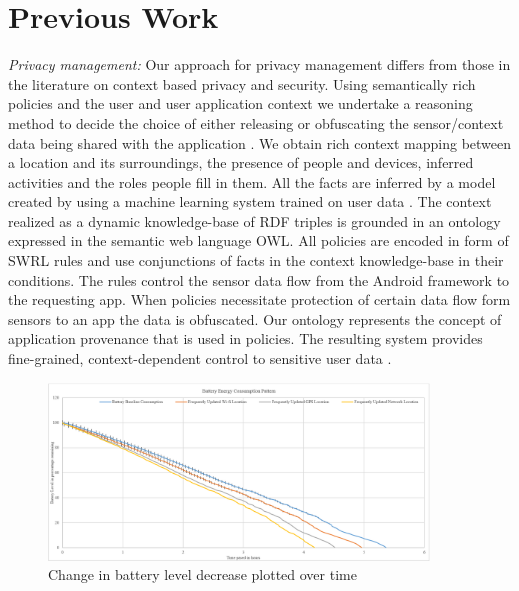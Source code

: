 \documentclass{ubicomp2013}
\begin{document}
\section{Previous Work}
{\em Privacy management:} Our approach for privacy management differs from those in the literature \cite{conti2011crepe, sadeh2003mycampus, enck2010taintdroid} on context based privacy and security. Using semantically rich policies and the user and user application context we undertake a reasoning method to decide the choice of either releasing or obfuscating the sensor/context data being shared with the application \cite{ghosh2012ms, ghosh2012privacy, palani2012infoflow}. We obtain rich context mapping between a location and its surroundings, the presence of people and devices, inferred activities and the roles people fill in them. All the facts are inferred by a model created by using a machine learning system trained on user data \cite{zavala2011mobile}. The context realized as a dynamic knowledge-base of RDF triples is grounded in an ontology expressed in the semantic web language OWL. All policies are encoded in form of SWRL \cite{horrocks2004swrl} rules and use conjunctions of facts in the context knowledge-base in their conditions. The rules control the sensor data flow from the Android framework to the requesting app. When policies necessitate protection of certain data flow form sensors to an app the data is obfuscated. Our ontology represents the concept of application provenance that is used in policies. The resulting system provides fine-grained, context-dependent control to sensitive user data \cite{ghosh2012ms}. 

\begin{figure}[tbh]
\centering
\includegraphics[width=0.9\textwidth]{Battery_Consumption_Pattern.png}
\caption{Change in battery level decrease plotted over time}
\label{fig:battery}
\end{figure}
\end{document}
